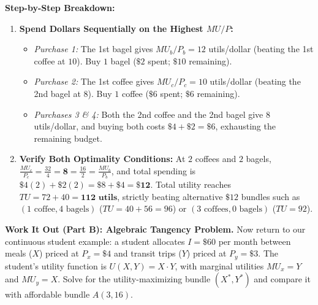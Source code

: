 \documentclass[11pt,letterpaper]{article}
\begin{document}
\noindent\textbf{Step-by-Step Breakdown:}
\begin{enumerate}
    \item \textbf{Spend Dollars Sequentially on the Highest $MU/P$:}
    \begin{itemize}
        \item \emph{Purchase 1:} The 1st bagel gives $MU_b/P_b = 12$ utils/dollar (beating the 1st coffee at $10$). Buy $1$ bagel ($\$2$ spent; $\$10$ remaining).
        \item \emph{Purchase 2:} The 1st coffee gives $MU_c/P_c = 10$ utils/dollar (beating the 2nd bagel at $8$). Buy $1$ coffee ($\$6$ spent; $\$6$ remaining).
        \item \emph{Purchases 3 \& 4:} Both the 2nd coffee and the 2nd bagel give $8$ utils/dollar, and buying both costs $\$4 + \$2 = \$6$, exhausting the remaining budget.
    \end{itemize}
    \item \textbf{Verify Both Optimality Conditions:}
    At $2$ coffees and $2$ bagels, $\frac{MU_c}{P_c} = \frac{32}{4} = \mathbf{8} = \frac{16}{2} = \frac{MU_b}{P_b}$, and total spending is $\$4(2) + \$2(2) = \$8 + \$4 = \mathbf{\$12}$. Total utility reaches $TU = 72 + 40 = \mathbf{112\text{ utils}}$, strictly beating alternative $\$12$ bundles such as $(1\text{ coffee}, 4\text{ bagels})$ ($TU = 40 + 56 = 96$) or $(3\text{ coffees}, 0\text{ bagels})$ ($TU = 92$).
\end{enumerate}

\medskip
\noindent\textbf{Work It Out (Part B): Algebraic Tangency Problem.}
Now return to our continuous student example: a student allocates $I = \$60$ per month between meals ($X$) priced at $P_x = \$4$ and transit trips ($Y$) priced at $P_y = \$3$. The student's utility function is $U(X, Y) = X \cdot Y$, with marginal utilities $MU_x = Y$ and $MU_y = X$. Solve for the utility-maximizing bundle $(X^*, Y^*)$ and compare it with affordable bundle $A(3, 16)$.
\end{document}
